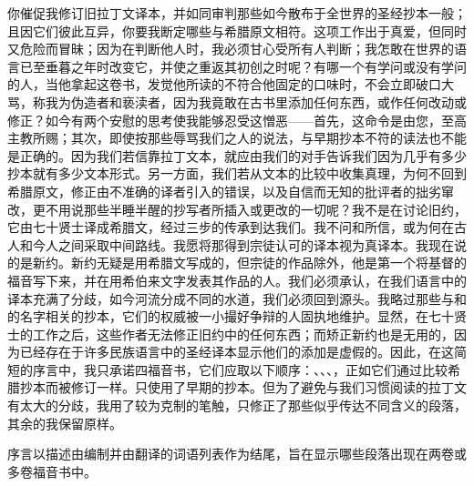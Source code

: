 你催促我修订旧拉丁文译本，并如同审判那些如今散布于全世界的圣经抄本一般；且因它们彼此互异，你要我断定哪些与希腊原文相符。这项工作出于真爱，但同时又危险而冒昧；因为在判断他人时，我必须甘心受所有人判断；我怎敢在世界的语言已至垂暮之年时改变它，并使之重返其初创之时呢？有哪一个有学问或没有学问的人，当他拿起这卷书，发觉他所读的不符合他固定的口味时，不会立即破口大骂，称我为伪造者和亵渎者，因为我竟敢在古书里添加任何东西，或作任何改动或修正？如今有两个安慰的思考使我能够忍受这憎恶——首先，这命令是由您，至高主教所赐；其次，即使按那些辱骂我们之人的说法，与早期抄本不符的读法也不能是正确的。因为我们若信靠拉丁文本，就应由我们的对手告诉我们因为几乎有多少抄本就有多少文本形式。另一方面，我们若从文本的比较中收集真理，为何不回到希腊原文，修正由不准确的译者引入的错误，以及自信而无知的批评者的拙劣窜改，更不用说那些半睡半醒的抄写者所插入或更改的一切呢？我不是在讨论旧约，它由七十贤士译成希腊文，经过三步的传承到达我们。我不问和所信，或为何在古人和今人之间采取中间路线。我愿将那得到宗徒认可的译本视为真译本。我现在说的是新约。新约无疑是用希腊文写成的，但宗徒的作品除外，他是第一个将基督的福音写下来，并在用希伯来文字发表其作品的人。我们必须承认，在我们语言中的译本充满了分歧，如今河流分成不同的水道，我们必须回到源头。我略过那些与和的名字相关的抄本，它们的权威被一小撮好争辩的人固执地维护。显然，在七十贤士的工作之后，这些作者无法修正旧约中的任何东西；而矫正新约也是无用的，因为已经存在于许多民族语言中的圣经译本显示他们的添加是虚假的。因此，在这简短的序言中，我只承诺四福音书，它们应取以下顺序：、、、，正如它们通过比较希腊抄本而被修订一样。只使用了早期的抄本。但为了避免与我们习惯阅读的拉丁文有太大的分歧，我用了较为克制的笔触，只修正了那些似乎传达不同含义的段落，其余的我保留原样。\par

序言以描述由编制并由翻译的词语列表作为结尾，旨在显示哪些段落出现在两卷或多卷福音书中。\par

